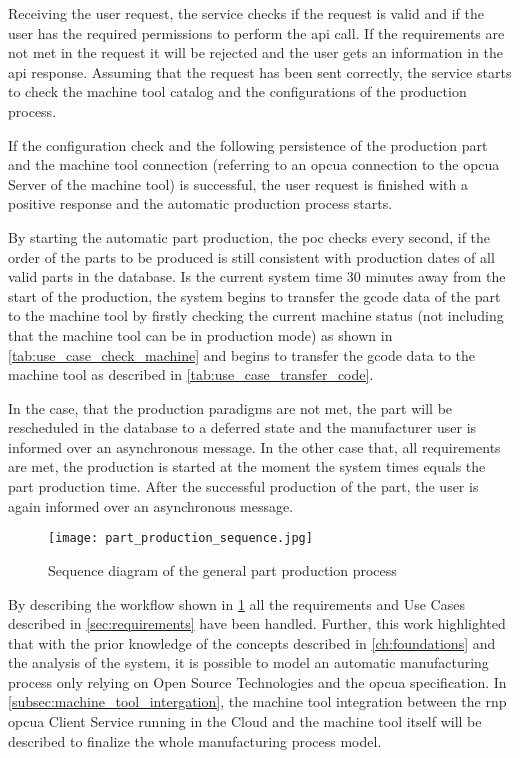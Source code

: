 \documentclass[
a4paper,
twoside,
headsepline,
cleardoublepage=empty,
parskip=half,
draft=false
]{scrbook}
\begin{document}
				Receiving the user request, the service checks if the request is valid and if the user has the required permissions to perform the \gls{api} call. If the requirements are not met in the request it will be rejected and the user gets an information in the \gls{api} response. Assuming that the request has been sent correctly, the service starts to check the machine tool catalog and the configurations of the production process.
				
				If the configuration check and the following persistence of the production part and the machine tool connection (referring to an \gls{opcua} connection to the \gls{opcua} Server of the machine tool) is successful, the user request is finished with a positive response and the automatic production process starts.
				
				By starting the automatic part production, the \gls{poc} checks every second, if the order of the parts to be produced is still consistent with production dates of all valid parts in the database. Is the current system time 30 minutes away from the start of the production, the system begins to transfer the \gls{gcode} data of the part to the machine tool by firstly checking the current machine status (not including that the machine tool can be in production mode) as shown in \cref{tab:use_case_check_machine} and begins to transfer the \gls{gcode} data to the machine tool as described in \cref{tab:use_case_transfer_code}.
				
				In the case, that the production paradigms are not met, the part will be rescheduled in the database to a deferred state and the manufacturer user is informed over an asynchronous message. In the other case that, all requirements are met, the production is started at the moment the system times equals the part production time. After the successful production of the part, the user is again informed over an asynchronous message.
				
				\begin{figure}[H]
					\centering
					\texttt{[image: part\_production\_sequence.jpg]}
					\caption{Sequence diagram of the general part production process}
					\label{fig:poc_workflow_diagram}
				\end{figure}
				
				By describing the workflow shown in \cref{fig:poc_workflow_diagram} all the requirements and Use Cases described in \cref{sec:requirements} have been handled. 
				Further, this work highlighted that with the prior knowledge of the concepts described in \cref{ch:foundations} and the analysis of the system, it is possible to model an automatic manufacturing process only relying on Open Source Technologies and the \gls{opcua} specification. 
				In \cref{subsec:machine_tool_intergation}, the machine tool integration between the \gls{rnp} \gls{opcua} Client Service running in the Cloud and the machine tool itself will be described to finalize the whole manufacturing process model.
				
\end{document}
